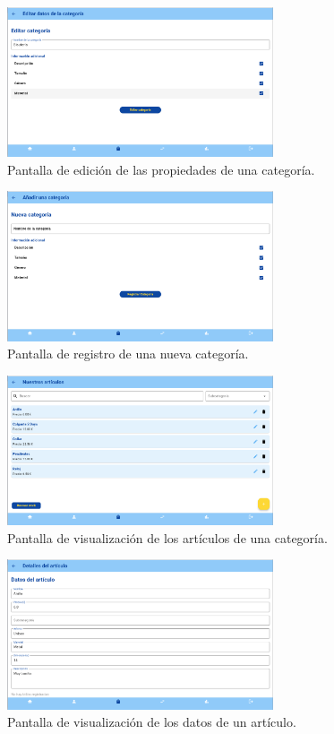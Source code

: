 \begin{figure}[H]
	\centering
	\includegraphics[width=0.7\textwidth]{imagenes/TerceraIteracion/categoryEdit.png}
	\caption{Pantalla de edición de las propiedades de una categoría.}
\end{figure}

\begin{figure}[H]
	\centering
	\includegraphics[width=0.7\textwidth]{imagenes/TerceraIteracion/newCategory.png}
	\caption{Pantalla de registro de una nueva categoría.}
\end{figure}

\begin{figure}[H]
	\centering
	\includegraphics[width=0.7\textwidth]{imagenes/TerceraIteracion/articleView.png}
	\caption{Pantalla de visualización de los artículos de una categoría.}
\end{figure}

\begin{figure}[H]
	\centering
	\includegraphics[width=0.7\textwidth]{imagenes/TerceraIteracion/articleDetails.png}
	\caption{Pantalla de visualización de los datos de un artículo.}
\end{figure}

